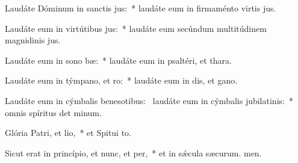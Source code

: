 \item Laudáte Dóminum in sanctis jus:~* laudáte eum in firmaménto virtis jus.
\item Laudáte eum in virtútibus jus:~* laudáte eum secúndum multitúdinem magnidinis jus.
\item Laudáte eum in sono bæ:~* laudáte eum in psaltéri, et thara.
\item Laudáte eum in týmpano, et ro:~* laudáte eum in dis, et gano.
\item Laudáte eum in cýmbalis benesotibus:~\pscross{} laudáte eum in cýmbalis jubilatinis:~* omnis spíritus det minum.
\item Glória Patri, et lio,~* et Spitui to.
\item Sicut erat in princípio, et nunc, et per,~* et in sǽcula sæcurum. men.
